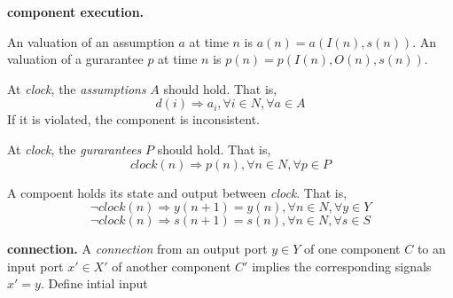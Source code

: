 {\bf component execution.}


An valuation of an assumption $a$ at time $n$ is $a(n) =  a(I(n), s(n))$. 
An valuation of a gurarantee $p$ at time $n$ is $p(n) =  p(I(n), O(n), s(n))$. 

At \emph{clock}, the \emph{assumptions} $A$ should hold. That is,
$$d(i) \Rightarrow a_i, \forall i\in N, \forall a \in A $$
If it is violated, the component is inconsistent.

At \emph{clock}, the \emph{gurarantees} $P$ should hold. That is,
$$clock(n) \Rightarrow p(n), \forall n\in N, \forall p \in P $$

A compoent holds its state and output between \emph{clock}. That is,
$$\lnot clock(n) \Rightarrow y(n+1) = y(n), \forall n \in N, \forall y \in Y$$
$$\lnot clock(n) \Rightarrow s(n+1) = s(n), \forall n \in N, \forall s \in S$$




{\bf connection.}
A \emph{connection} from an output port $y \in Y$ of one component $C$ to an input port $x' \in X'$ of another component $C'$ implies the corresponding signals $x' = y$.
Define intial input



